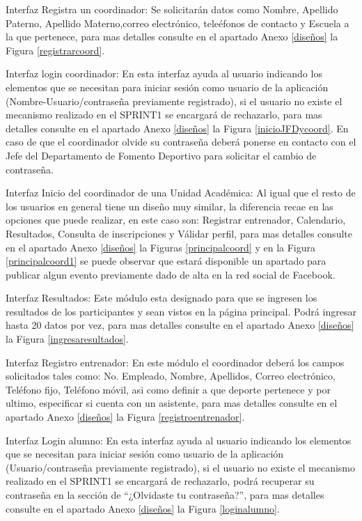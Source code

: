 	\noindent Interfaz Registra un coordinador: Se solicitarán datos como Nombre, Apellido Paterno, Apellido Materno,correo electrónico, teleéfonos de contacto y Escuela a la que pertenece, para mas detalles consulte en el apartado Anexo \ref{diseños} la Figura \ref{registrarcoord}.
	
	\noindent Interfaz login coordinador: En esta interfaz ayuda al usuario indicando los elementos que se necesitan para iniciar sesión como usuario de la aplicación (Nombre-Usuario/contraseña previamente registrado), si el usuario no existe el mecanismo realizado en el SPRINT1 se encargará de rechazarlo, para mas detalles consulte en el apartado Anexo \ref{diseños} la Figura \ref{inicioJFDycoord}. En caso de que el coordinador olvide su contraseña deberá ponerse en contacto con el Jefe del Departamento de Fomento Deportivo para solicitar el cambio de contraseña.
	\newline
	
	\noindent Interfaz  Inicio del coordinador de una Unidad Académica: Al igual que el resto de los usuarios en general tiene un diseño muy similar, la diferencia recae en las opciones que puede realizar, en este caso son: Registrar entrenador, Calendario, Resultados, Consulta de inscripciones y Válidar perfil, para mas detalles consulte en el apartado Anexo \ref{diseños} la Figuras 	\ref{principalcoord} y en la Figura \ref{principalcoord1} se puede observar que estará disponible un apartado para publicar algun evento previamente dado de alta en la red social de Facebook.
	\newline
	
	\noindent Interfaz Resultados: Este módulo esta designado para que se ingresen los resultados de los participantes y sean vistos en la página principal. Podrá ingresar hasta 20 datos por vez, para mas detalles consulte en el apartado Anexo \ref{diseños} la Figura \ref{ingresaresultados}.
	\newline
	
	\noindent Interfaz Registro entrenador: En este  módulo el coordinador deberá los campos solicitados tales como: No. Empleado, Nombre, Apellidos, Correo electrónico, Teléfono fijo, Teléfono móvil, asi como definir a que deporte pertenece y por ultimo, especificar si cuenta con un asistente, para mas detalles consulte en el apartado Anexo \ref{diseños} la Figura \ref{registroentrenador}.
	\newline
	
	\noindent Interfaz Login alumno: En esta interfaz ayuda al usuario indicando los elementos que se necesitan para iniciar sesión como usuario de la aplicación (Usuario/contraseña previamente registrado), si el usuario no existe el mecanismo realizado en el SPRINT1 se encargará de rechazarlo, podrá recuperar su contraseña en la sección de “¿Olvidaste tu contraseña?”, para mas detalles consulte en el apartado Anexo \ref{diseños} la Figura \ref{loginalumno}.
	\newline
	
